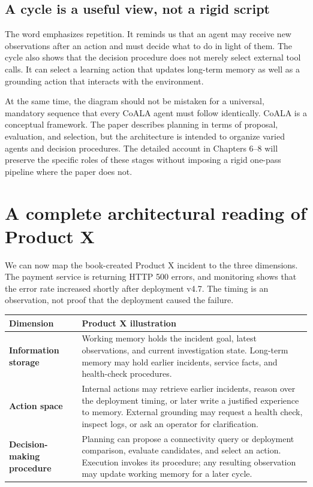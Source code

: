 \subsection{A cycle is a useful view, not a rigid script}

The word  emphasizes repetition. It reminds us that an agent may receive new observations after an action and must decide what to do in light of them. The cycle also shows that the decision procedure does not merely select external tool calls. It can select a learning action that updates long-term memory as well as a grounding action that interacts with the environment.

At the same time, the diagram should not be mistaken for a universal, mandatory sequence that every CoALA agent must follow identically. CoALA is a conceptual framework. The paper describes planning in terms of proposal, evaluation, and selection, but the architecture is intended to organize varied agents and decision procedures. The detailed account in Chapters 6--8 will preserve the specific roles of these stages without imposing a rigid one-pass pipeline where the paper does not.

\section{A complete architectural reading of Product X}

We can now map the book-created Product X incident to the three dimensions. The payment service is returning HTTP 500 errors, and monitoring shows that the error rate increased shortly after deployment v4.7. The timing is an observation, not proof that the deployment caused the failure.

\begin{center}
\begin{tabularx}{\textwidth}{>{\bfseries}p{} X}
\toprule
Dimension & Product X illustration \\
\midrule
Information storage & Working memory holds the incident goal, latest observations, and current investigation state. Long-term memory may hold earlier incidents, service facts, and health-check procedures. \\
Action space & Internal actions may retrieve earlier incidents, reason over the deployment timing, or later write a justified experience to memory. External grounding may request a health check, inspect logs, or ask an operator for clarification. \\
Decision-making procedure & Planning can propose a connectivity query or deployment comparison, evaluate candidates, and select an action. Execution invokes its procedure; any resulting observation may update working memory for a later cycle. \\
\bottomrule
\end{tabularx}
\end{center}

